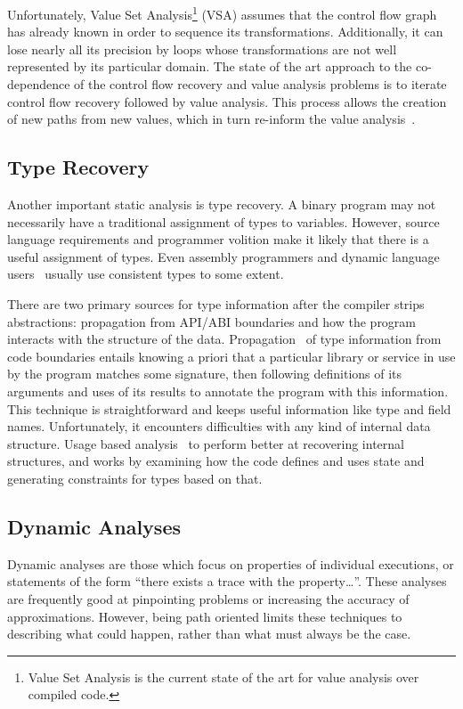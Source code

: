 Unfortunately, Value Set Analysis\footnote{
  Value Set Analysis is the current state of the art for value analysis over compiled code.
} (VSA) assumes that the control flow graph has already known in order to sequence its transformations.
Additionally, it can lose nearly all its precision by loops whose transformations are not well represented by its particular domain.
The state of the art approach to the co-dependence of the control flow recovery and value analysis problems is to iterate control flow recovery followed by value analysis.
This process allows the creation of new paths from new values, which in turn re-inform the value analysis~\cite{jakstab}.

\subsection{Type Recovery}
Another important static analysis is type recovery.
A binary program may not necessarily have a traditional assignment of types to variables.
However, source language requirements and programmer volition make it likely that there is a useful assignment of types.
Even assembly programmers and dynamic language users~\cite{jsinfer} usually use consistent types to some extent.

There are two primary sources for type information after the compiler strips abstractions: propagation from API/ABI boundaries and how the program interacts with the structure of the data.
Propagation~\cite{howard} of type information from code boundaries entails knowing a priori that a particular library or service in use by the program matches some signature, then following definitions of its arguments and uses of its results to annotate the program with this information.
This technique is straightforward and keeps useful information like type and field names. 
Unfortunately, it encounters difficulties with any kind of internal data structure.
Usage based analysis~\cite{tie,bitr} to perform better at recovering internal structures, and works by examining how the code defines and uses state and generating constraints for types based on that.



\subsection{Dynamic Analyses}
Dynamic analyses are those which focus on properties of individual executions, or statements of the form ``there exists a trace with the property\ldots''.
These analyses are frequently good at pinpointing problems or increasing the accuracy of approximations.
However, being path oriented limits these techniques to describing what could happen, rather than what must always be the case.

